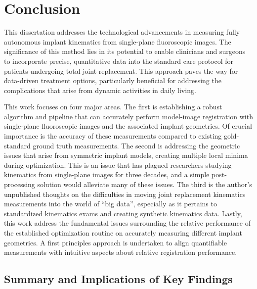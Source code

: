 \chapter{Conclusion}

This dissertation addresses the technological advancements in measuring fully autonomous implant kinematics from single-plane fluoroscopic images.
The significance of this method lies in its potential to enable clinicians and surgeons to incorporate precise, quantitative data into the standard care protocol for patients undergoing total joint replacement.
This approach paves the way for data-driven treatment options, particularly beneficial for addressing the complications that arise from dynamic activities in daily living.

This work focuses on four major areas.
The first is establishing a robust algorithm and pipeline that can accurately perform model-image registration with single-plane fluoroscopic images and the associated implant geometries.
Of crucial importance is the accuracy of these measurements compared to existing gold-standard ground truth measurements.
The second is addressing the geometric issues that arise from symmetric implant models, creating multiple local minima during optimization.
This is an issue that has plagued researchers studying kinematics from single-plane images for three decades, and a simple post-processing solution would alleviate many of these issues.
The third is the author's unpublished thoughts on the difficulties in moving joint replacement kinematics measurements into the world of ``big data'', especially as it pertains to standardized kinematics exams and creating synthetic kinematics data.
Lastly, this work address the fundamental issues surrounding the relative performance of the established optimization routine on accurately measuring different implant geometries.
A first principles approach is undertaken to align quantifiable measurements with intuitive aspects about relative registration performance.

\section{Summary and Implications of Key Findings}
